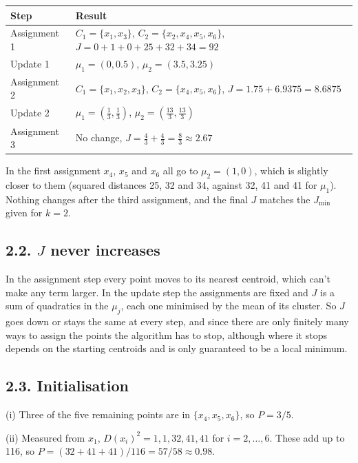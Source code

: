 \documentclass[11pt,a4paper]{article}
\begin{document}
{\small\setlength{\tabcolsep}{4pt}
\begin{tabularx}{\linewidth}{|l|L|}
\hline
{}
\textbf{Step} & \textbf{Result} \\ \hline
Assignment 1 & $C_1=\{x_1,x_3\}$, $C_2=\{x_2,x_4,x_5,x_6\}$, $J=0+1+0+25+32+34=92$ \\ \hline
Update 1 & $\mu_1=(0,0.5)$, $\mu_2=(3.5,3.25)$ \\ \hline
Assignment 2 & $C_1=\{x_1,x_2,x_3\}$, $C_2=\{x_4,x_5,x_6\}$, $J=1.75+6.9375=8.6875$ \\ \hline
Update 2 & $\mu_1=(\tfrac13,\tfrac13)$, $\mu_2=(\tfrac{13}3,\tfrac{13}3)$ \\ \hline
Assignment 3 & No change, $J=\tfrac43+\tfrac43=\tfrac83\approx2.67$ \\ \hline
\end{tabularx}\par}

In the first assignment $x_4$, $x_5$ and $x_6$ all go to $\mu_2=(1,0)$, which is slightly closer to them (squared distances 25, 32 and 34, against 32, 41 and 41 for $\mu_1$). Nothing changes after the third assignment, and the final $J$ matches the $J_{\min}$ given for $k=2$.

\subsection*{2.2. $J$ never increases}

In the assignment step every point moves to its nearest centroid, which can't make any term larger. In the update step the assignments are fixed and $J$ is a sum of quadratics in the $\mu_j$, each one minimised by the mean of its cluster. So $J$ goes down or stays the same at every step, and since there are only finitely many ways to assign the points the algorithm has to stop, although where it stops depends on the starting centroids and is only guaranteed to be a local minimum.

\subsection*{2.3. Initialisation}

(i) Three of the five remaining points are in $\{x_4,x_5,x_6\}$, so $P=3/5$.

(ii) Measured from $x_1$, $D(x_i)^2=1,1,32,41,41$ for $i=2,\dots,6$. These add up to 116, so $P=(32+41+41)/116=57/58\approx0.98$.
\end{document}
